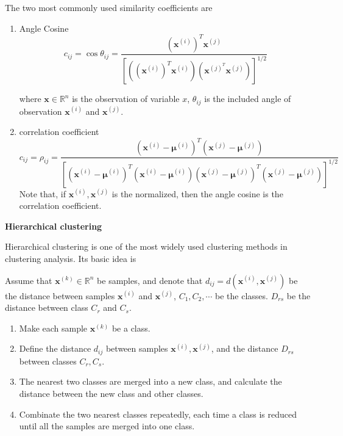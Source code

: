 The two most commonly used similarity coefficients are

\begin{enumerate}
	\item Angle Cosine
	\[
	 	c_{ij}=\cos \theta_{ij}=\frac{(\boldsymbol x ^{(i)})^T\boldsymbol x ^{(j)}}{[((\boldsymbol x ^{(i)})^T\boldsymbol x ^{(i)})(\boldsymbol x ^{(j)}^T\boldsymbol x ^{(j)})]^{1/2}}
	 \]
	
	where $\boldsymbol x\in\mathbb{R}^n$ is the observation of variable $x$, $\theta_{ij}$ is the included angle of observation $\boldsymbol x ^{(i)}$ and $\boldsymbol x ^{(j)}$.

	\item correlation coefficient
	\[
		c_{ij}=\rho_{ij}=\frac{(\boldsymbol x ^{(i)}-\boldsymbol\mu^{(i)})^T(\boldsymbol x ^{(j)}-
		\boldsymbol \mu^{(j)})}{[(\boldsymbol x ^{(i)}-\boldsymbol\mu^{(i)})^T(\boldsymbol x ^{(i)}-\boldsymbol\mu^{(i)})(\boldsymbol x ^{(j)}-\boldsymbol\mu^{(j)})^T(\boldsymbol x ^{(j)}-\boldsymbol\mu^{(j)})]^{1/2}}
	\]
Note that, if $\boldsymbol x ^{(i)},\boldsymbol x ^{(j)}$ is the normalized, then the angle cosine is the correlation coefficient.
\end{enumerate}

\noindent\textbf{Hierarchical clustering}

Hierarchical clustering is one of the most widely used clustering methods in clustering analysis. Its basic idea is 

Assume that $\boldsymbol x^{(k)} \in \mathbb{R}^n$ be samples, and denote that $d_{ij}=d(\boldsymbol x ^{(i)},\boldsymbol x ^{(j)})$ be the distance between samples $\boldsymbol x ^{(i)}$ and $\boldsymbol x ^{(j)}$, $C_1,C_2,\cdots$ be the classes. $D_{rs}$ be the distance between class $C_r$ and $C_s$.

\begin{enumerate}
	\item Make each sample $\boldsymbol x^{(k)}$ be a class.
	\item Define the distance $d_{ij}$ between samples $\boldsymbol x ^{(i)}, \boldsymbol x ^{(j)}$, and the distance $D_{rs}$ between classes $C_r, C_s$.
	\item The nearest two classes are merged into a new class, and calculate the distance between the new class and other classes.
	\item Combinate the two nearest classes repeatedly, each time a class is reduced until all the samples are merged into one class.
\end{enumerate}

